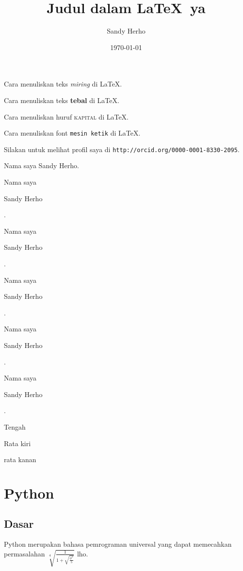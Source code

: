 \documentclass[11pt]{article}
\begin{document}
\tableofcontents
\title{Judul dalam \LaTeX\ ya}
\author{Sandy Herho}
\date{\today}
\maketitle

Cara menuliskan teks \textit{miring} di LaTeX.

Cara menuliskan teks \textbf{tebal} di LaTeX.

Cara menuliskan huruf \textsc{kapital} di LaTeX.

Cara menuliskan font \texttt{mesin ketik} di LaTeX.

Silakan untuk melihat profil saya di \texttt{http://orcid.org/0000-0001-8330-2095}.

Nama saya Sandy Herho.

Nama saya \begin{large}Sandy Herho\end{large}.

Nama saya \begin{Large}Sandy Herho\end{Large}.

Nama saya \begin{huge}Sandy Herho\end{huge}.

Nama saya \begin{small}Sandy Herho\end{small}.

Nama saya\begin{tiny} Sandy Herho\end{tiny}.

\begin{center}
Tengah
\end{center}

\begin{flushleft}
Rata kiri
\end{flushleft}

\begin{flushright}
rata kanan
\end{flushright}

\section{Python}
	\subsection{Dasar}
	Python merupakan bahasa pemrograman universal yang dapat memecahkan permasalahan $\sqrt[4]{\frac{1}{1+\sqrt{\frac{\phi^2}{5}}}}$ lho.
\end{document}
